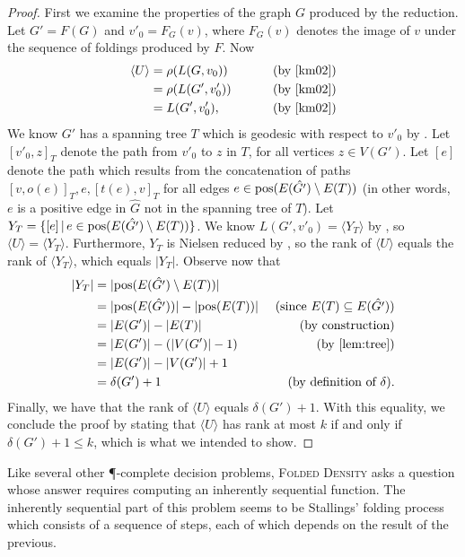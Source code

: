 \documentclass{article}
\newcommand{\FD}{\textsc{Folded Density}}
\newcommand{\gen}[1]{\langle #1 \rangle}
\newcommand{\pos}{\textnormal{pos}}
\begin{document}
\begin{proof}
  First we examine the properties of the graph $G$ produced by the reduction.
  Let $G' = F(G)$ and $v'_0 = F_G(v)$, where $F_G(v)$ denotes the image of $v$ under the sequence of foldings produced by $F$.
  Now
  \begin{align*}
    \gen{U} & = \rho(L(G, v_0)) & \qquad \text{ (by \cite[Proposition~3.8]{km02})} \\
            & = \rho(L(G', v'_0)) & \qquad \text{ (by \cite[Lemma~3.4]{km02})} \\
            & = L(G', v'_0), & \qquad \text{ (by \cite[Lemma~2.9]{km02})}
  \end{align*}
  We know $G'$ has a spanning tree $T$ which is geodesic with respect to $v'_0$ by \cite[Lemma~6.6]{km02}.
  Let $[v'_0, z]_T$ denote the path from $v'_0$ to $z$ in $T$, for all vertices $z \in V(G')$.
  Let $[e]$ denote the path which results from the concatenation of paths $[v, o(e)]_T, e, [t(e), v]_T$ for all edges $e \in \pos(E(\hat{G'}) \setminus E(T))$ (in other words, $e$ is a positive edge in $\hat{G}$ not in the spanning tree of $T$).
  Let $Y_T = \{[e] \, | \, e \in \pos(E(\hat{G'}) \setminus E(T)) \}$.
  We know $L(G', v'_0) = \gen{Y_T}$ by \cite[Lemma~6.1]{km02}, so $\gen{U} = \gen{Y_T}$.
  Furthermore, $Y_T$ is Nielsen reduced by \cite[Proposition~6.7]{km02}, so the rank of $\gen{U}$ equals the rank of $\gen{Y_T}$, which equals $|Y_T|$.
  Observe now that
  \begin{align*}
    |Y_T| & = |\pos(E(\hat{G'}) \setminus E(T))| & \\
          & = |\pos(E(\hat{G'}))| - |\pos(E(T))| & \text{ (since } E(T) \subseteq E(\hat{G'}) \text{)} \\
          & = |E(G')| - |E(T)| & \text{ (by construction)} \\
          & = |E(G')| - (|V(G')| - 1) & \text{ (by \autoref{lem:tree})} \\
          & = |E(G')| - |V(G')| + 1 & \\
          & = \delta(G') + 1 & \text{ (by definition of } \delta \text{)}.
  \end{align*}
  Finally, we have that the rank of $\gen{U}$ equals $\delta(G') + 1$.
  With this equality, we conclude the proof by stating that $\gen{U}$ has rank at most $k$ if and only if $\delta(G') + 1 \leq k$, which is what we intended to show.
\end{proof}

Like several other \P-complete decision problems, \FD{} asks a question whose answer requires computing an inherently sequential function.
The inherently sequential part of this problem seems to be Stallings' folding process which consists of a sequence of steps, each of which depends on the result of the previous.
\end{document}
